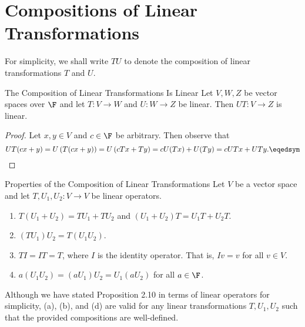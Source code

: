 \documentclass[linearalgebra]{subfiles}
\begin{document}
    \section{Compositions of Linear Transformations}

    \begin{remark}
        For simplicity, we shall write $TU$ to denote the composition of linear transformations $T$ and $U$.
    \end{remark}

    \clearpage
    \begin{prop}{The Composition of Linear Transformations Is Linear}
        Let $V, W, Z$ be vector spaces over $\F$ and let $T: V\to W$ and $U: W\to Z$ be linear. Then $UT: V\to Z$ is linear.
    \end{prop}

    \begin{proof}
        Let $x,y\in V$ and $c\in \F$ be arbitrary. Then observe that
        \begin{equation*}
            UT(cx+y) = U \left( T(cx+y) \right) = U \left( cTx + Ty \right) = cU(Tx) + U(Ty) = cUTx + UTy. \eqedsym
        \end{equation*}
    \end{proof}

    \begin{prop}{Properties of the Composition of Linear Transformations}
        Let $V$ be a vector space and let $T, U_1, U_2:V\to V$ be linear operators.
        \begin{enumerate}
            \item $T\left( U_1+U_2 \right)  = TU_1 + TU_2$ and $(U_1+U_2)T = U_1T + U_2T$.
            \item $(TU_1)U_2 = T(U_1U_2)$.
            \item $TI = IT = T$, where $I$ is the identity operator. That is, $Iv = v$ for all $v\in V$.
            \item $a(U_1U_2) = (aU_1)U_2 = U_1(aU_2)$ for all $a\in \F$.
        \end{enumerate}
    \end{prop}

    \begin{remark}
        Although we have stated Proposition 2.10 in terms of linear operators for simplicity, (a), (b), and (d) are valid for any linear transformations $T, U_1, U_2$ such that the provided compositions are well-defined.
    \end{remark}
\end{document}
